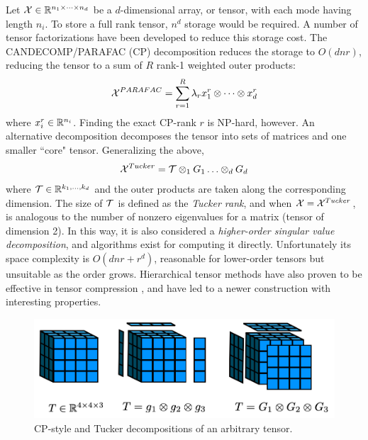 Let $\mathcal{X} \in \mathbb{R}^{n_1 \times \cdots \times n_d}$ be a $d$-dimensional array, or tensor, with each mode having length $n_i$. To store a full rank tensor, $n^d$ storage would be required.
A number of tensor factorizations have been developed to reduce this storage cost.
The CANDECOMP/PARAFAC (CP) decomposition \citep{harshman1970foundations,carroll1970analysis} reduces the storage to $O(dnr)$,
reducing the tensor to a sum of $R$ rank-1 weighted outer products:
\begin{align}
\mathcal{X}^{PARAFAC} = \sum_{r=1}^R \lambda_r x_1^r \otimes \cdots \otimes x_d^r
\end{align}
where $x_i^r \in \mathbb{R}^{n_i}$. Finding the exact CP-rank $r$ is NP-hard, however.
An alternative decomposition decomposes the tensor into sets of matrices and one smaller ``core" tensor.
Generalizing the above,
\begin{align}
\mathcal{X}^{Tucker} = \mathcal{T} \otimes_1 G_1 \ldots \otimes_d G_d 
\end{align}
where $\mathcal{T} \in \mathbb{R}^{k_1,\ldots,k_d}$ and the outer products are taken along the corresponding dimension.
The size of $\mathcal{T}$ is defined as the \textit{Tucker rank}, and when $\mathcal{X} = \mathcal{X}^{Tucker}$, is analogous to the number of nonzero
eigenvalues for a matrix (tensor of dimension 2).
In this way, it is also considered a \textit{higher-order singular value decomposition},
and algorithms exist for computing it directly.
Unfortunately its space complexity is $O(dnr + r^d)$, reasonable for lower-order tensors
but unsuitable as the order grows.
Hierarchical tensor methods have also proven to be effective in tensor compression \citep{cohen2016expressive, cohen2016convolutional},
and have led to a newer construction with interesting properties.
\begin{figure}
	\includegraphics[width=\textwidth]{2_bknd/tensor_decomps.png}
	\caption[Tensor decompositions]{\label{fig:cp_decomp} CP-style and Tucker decompositions of an arbitrary tensor.}
\end{figure}


